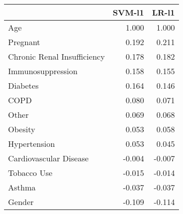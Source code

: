 \begin{tabular}{lrr}
\toprule
{} &  SVM-l1 &  LR-l1 \\
\midrule
Age                         &   1.000 &  1.000 \\
Pregnant                    &   0.192 &  0.211 \\
Chronic Renal Insufficiency &   0.178 &  0.182 \\
Immunosuppression           &   0.158 &  0.155 \\
Diabetes                    &   0.164 &  0.146 \\
COPD                        &   0.080 &  0.071 \\
Other                       &   0.069 &  0.068 \\
Obesity                     &   0.053 &  0.058 \\
Hypertension                &   0.053 &  0.045 \\
Cardiovascular Disease      &  -0.004 & -0.007 \\
Tobacco Use                 &  -0.015 & -0.014 \\
Asthma                      &  -0.037 & -0.037 \\
Gender                      &  -0.109 & -0.114 \\
\bottomrule
\end{tabular}
